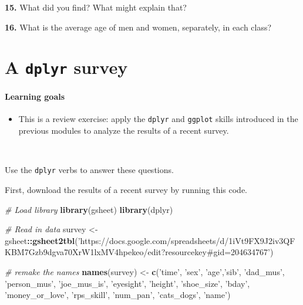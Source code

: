 \documentclass[]{book}
\newenvironment{Shaded}{\begin{snugshade}}{\end{snugshade}}
\newcommand{\CommentTok}[1]{\textcolor[rgb]{0.56,0.35,0.01}{\textit{#1}}}
\newcommand{\KeywordTok}[1]{\textcolor[rgb]{0.13,0.29,0.53}{\textbf{#1}}}
\newcommand{\NormalTok}[1]{#1}
\newcommand{\OperatorTok}[1]{\textcolor[rgb]{0.81,0.36,0.00}{\textbf{#1}}}
\newcommand{\StringTok}[1]{\textcolor[rgb]{0.31,0.60,0.02}{#1}}
\providecommand{\tightlist}{%
  \setlength{\itemsep}{0pt}\setlength{\parskip}{0pt}}
\begin{document}
\textbf{15.} What did you find? What might explain that?

\textbf{16.} What is the average age of men and women, separately, in each class?

\hypertarget{a-dplyr-survey}{%
\chapter{\texorpdfstring{A \texttt{dplyr} survey}{A dplyr survey}}\label{a-dplyr-survey}}

\hypertarget{learning-goals-19}{%
\subsubsection*{Learning goals}\label{learning-goals-19}}

\begin{itemize}
\tightlist
\item
  This is a review exercise: apply the \texttt{dplyr} and \texttt{ggplot} skills introduced in the previous modules to analyze the results of a recent survey.
\end{itemize}

~

Use the \texttt{dplyr} verbs to answer these questions.

First, download the results of a recent survey by running this code.

\begin{Shaded}
\begin{Highlighting}[]
\CommentTok{# Load library}
\KeywordTok{library}\NormalTok{(gsheet)}
\KeywordTok{library}\NormalTok{(dplyr)}

\CommentTok{# Read in data}
\NormalTok{survey  <-}\StringTok{ }\NormalTok{gsheet}\OperatorTok{::}\KeywordTok{gsheet2tbl}\NormalTok{(}\StringTok{'https://docs.google.com/spreadsheets/d/1iVt9FX9J2iv3QFKBM7Gzb9dgva70XrW1lxMV4hpekeo/edit?resourcekey#gid=204634767'}\NormalTok{)}

\CommentTok{# remake the names}
\KeywordTok{names}\NormalTok{(survey) <-}\StringTok{ }\KeywordTok{c}\NormalTok{(}\StringTok{'time'}\NormalTok{, }\StringTok{'sex'}\NormalTok{, }\StringTok{'age'}\NormalTok{,}\StringTok{'sib'}\NormalTok{, }\StringTok{'dad_mus'}\NormalTok{, }\StringTok{'person_mus'}\NormalTok{, }\StringTok{'joe_mus_is'}\NormalTok{, }\StringTok{'eyesight'}\NormalTok{, }\StringTok{'height'}\NormalTok{, }\StringTok{'shoe_size'}\NormalTok{, }\StringTok{'bday'}\NormalTok{, }\StringTok{'money_or_love'}\NormalTok{, }\StringTok{'rps_skill'}\NormalTok{, }\StringTok{'num_pan'}\NormalTok{, }\StringTok{'cats_dogs'}\NormalTok{, }\StringTok{'name'}\NormalTok{)}
\end{Highlighting}
\end{Shaded}
\end{document}
